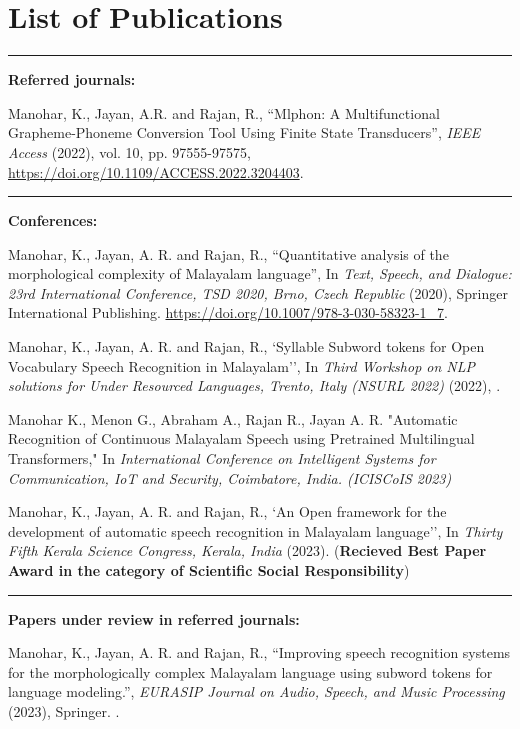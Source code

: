 \chapter*{List of Publications} \label{publications}
\noindent\rule{\linewidth}{2pt}
\textbf{{\large Referred journals:}}
\begin{enumerate}[label=\textbf{[\arabic*]}]

\item Manohar, K., Jayan, A.R. and Rajan, R., ``Mlphon: A Multifunctional Grapheme-Phoneme Conversion Tool Using Finite State Transducers'',
\emph{IEEE Access} (2022), vol. 10, pp. 97555-97575, 
\url{https://doi.org/10.1109/ACCESS.2022.3204403}.




\end{enumerate}

\noindent\rule{\linewidth}{0.2pt}
\textbf{{\large Conferences:}}
\begin{enumerate}[label=\textbf{[\arabic*]}]

\item Manohar, K., Jayan, A. R. and Rajan, R., ``Quantitative analysis of the morphological complexity of Malayalam language'',
In \emph{ Text, Speech, and Dialogue: 23rd International Conference, TSD 2020, Brno, Czech Republic} (2020), Springer International Publishing.
\url{https://doi.org/10.1007/978-3-030-58323-1_7}.

\item Manohar, K., Jayan, A. R. and Rajan, R., `Syllable Subword tokens for Open Vocabulary Speech Recognition in Malayalam'',
In \emph{Third Workshop on NLP solutions for Under Resourced Languages, Trento, Italy (NSURL 2022)} (2022), \url{}.

\item Manohar K., Menon G., Abraham A., Rajan R., Jayan A. R.  "Automatic Recognition of Continuous Malayalam Speech using Pretrained Multilingual Transformers," In \emph{  International Conference on Intelligent Systems for Communication, IoT and Security, Coimbatore, India. (ICISCoIS 2023)}

\item Manohar, K., Jayan, A. R. and Rajan, R., `An Open framework for the development of automatic speech recognition in Malayalam language'',
In \emph{Thirty Fifth Kerala Science Congress, Kerala, India} (2023). (\textbf{Recieved Best Paper Award in the category of Scientific Social Responsibility})


\end{enumerate}
\noindent\rule{\linewidth}{0.2pt}
\textbf{{\large Papers under review in referred journals:}}
\begin{enumerate}[label=\textbf{[\arabic*]}]
\item Manohar, K., Jayan, A. R. and Rajan, R., ``Improving speech recognition systems for the morphologically complex Malayalam language using subword tokens for language modeling.'',
\emph{EURASIP Journal on Audio, Speech, and Music Processing} (2023), Springer.
\url{}.
\end{enumerate}
